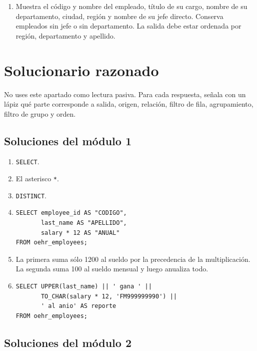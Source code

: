 \documentclass[11pt,a4paper]{article}
\newif\ifmostrarSoluciones
\newcommand{\campo}[1]{\texttt{#1}}
\begin{document}
\begin{enumerate}[label=\textbf{S.\arabic*},resume]
  \item Muestra el código y nombre del empleado, título de su cargo, nombre de su departamento,
  ciudad, región y nombre de su jefe directo. Conserva empleados sin jefe o sin departamento. La
  salida debe estar ordenada por región, departamento y apellido.
\end{enumerate}

\ifmostrarSoluciones
\newpage
\section{Solucionario razonado}

No uses este apartado como lectura pasiva. Para cada respuesta, señala con un lápiz qué parte
corresponde a salida, origen, relación, filtro de fila, agrupamiento, filtro de grupo y orden.

\subsection{Soluciones del módulo 1}

\begin{enumerate}[label=\textbf{M1.\arabic*}]
  \item \campo{SELECT}.
  \item El asterisco \campo{*}.
  \item \campo{DISTINCT}.
  \item
\begin{lstlisting}
SELECT employee_id AS "CODIGO",
       last_name AS "APELLIDO",
       salary * 12 AS "ANUAL"
FROM oehr_employees;
\end{lstlisting}
  \item La primera suma sólo 1200 al sueldo por la precedencia de la multiplicación. La segunda suma
  100 al sueldo mensual y luego anualiza todo.
  \item
\begin{lstlisting}
SELECT UPPER(last_name) || ' gana ' ||
       TO_CHAR(salary * 12, 'FM999999990') ||
       ' al anio' AS reporte
FROM oehr_employees;
\end{lstlisting}
\end{enumerate}

\subsection{Soluciones del módulo 2}
\end{document}
